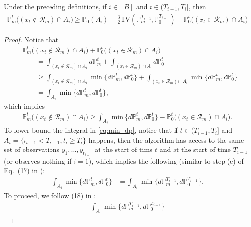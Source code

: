 \documentclass[10pt]{article}
\begin{document}
\begin{lemma}
    \label{lem:change_measure}
    Under the preceding definitions, if $i\in [B]$ and $t \in (T_{i-1}, T_i]$, then
    \begin{align}
        \mathbb{P}_m^t\bigl((x_t \notin \mathcal{R}_m )\cap A_i\bigr)
        \geq \mathbb{P}_0(A_i) - \frac{3}{2} \mathrm{TV}(\mathbb{P}_m^{T_{i-1}}, \mathbb{P}_0^{T_{i-1}}) - \mathbb{P}_0^t \bigl((x_t \in \mathcal{R}_m )\cap A_i\bigr)
    \end{align}
\end{lemma}
\begin{proof}
    Notice that
    \begin{align}
        & \mathbb{P}_m^t\bigl((x_t \notin \mathcal{R}_m )\cap A_i\bigr) + \mathbb{P}_0^t\bigl((x_t \in \mathcal{R}_m )\cap A_i\bigr) \nonumber \\
        & \qquad = \int_{(x_t \notin \mathcal{R}_m )\cap A_i} d\mathbb{P}_m^t + \int_{(x_t \in \mathcal{R}_m )\cap A_i} d\mathbb{P}_0^t \\
        & \qquad\geq  \int_{(x_t \notin \mathcal{R}_m )\cap A_i} \min\{d\mathbb{P}_m^t, d\mathbb{P}_0^t\} + \int_{(x_t \in \mathcal{R}_m )\cap A_i} \min\{d\mathbb{P}_m^t, d\mathbb{P}_0^t\} \\
        & \qquad = \int_{A_i} \min\{d\mathbb{P}_m^t, d\mathbb{P}_0^t\},
    \end{align}
    which implies
    \begin{align}
        \mathbb{P}_m^t\bigl((x_t \notin \mathcal{R}_m )\cap A_i\bigr)
        \geq \int_{A_i} \min\{d\mathbb{P}_m^t, d\mathbb{P}_0^t\} - \mathbb{P}_0^t \bigl((x_t \in \mathcal{R}_m )\cap A_i\bigr). \label{eq:min_dp}
    \end{align}
    To lower bound the integral in \eqref{eq:min_dp},
    notice that if $t \in (T_{i-1}, T_i]$ and $A_i = \{t_{i-1} < T_{i-1}, t_i \geq T_i \}$ happens, 
    then the algorithm has access to the same set of observations $y_1,\ldots, y_{t_{i-1}} $ at the start of time $t$ and at the start of time $T_{i-1}$ (or observes nothing if $i=1$),
    which implies the following (similar to step (c) of Eq.~(17) in \citep{Gao19}):
    \begin{align}
        \int_{A_i} \min\{d\mathbb{P}_m^t, d\mathbb{P}_0^t\}
        & = \int_{A_i} \min\{d\mathbb{P}_m^{T_{i-1}}, d\mathbb{P}_0^{T_{i-1}}\}. \label{eq:no_observation}
    \end{align}
    To proceed, we follow (18) in \citep{Gao19}:
    \begin{align}
        \int_{A_i} \min\{d\mathbb{P}_m^{T_{i-1}}, d\mathbb{P}_0^{T_{i-1}}\}

\end{align}
\end{proof}
\end{document}
